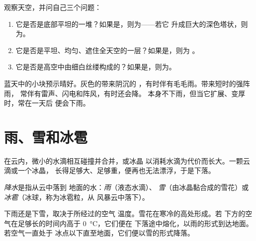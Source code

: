 \begin{method}[识别云]\label{met:g4:clouds-rain-snow:naming}
观察天空，并问自己三个问题：
\begin{enumerate}
  \item 它是否是底部平坦的一堆？如果是，则为——若它
        升成巨大的深色塔状，则为。
  \item 它是否是平坦、均匀、遮住全天空的一层？如果是，则为
        。
  \item 它是否是高空中由细白丝缕构成的？如果是，则为。
\end{enumerate}
\end{method}

\begin{remark}[云预示天气]\label{rem:g4:clouds-rain-snow:tell}
蓝天中的小块预示晴好。灰色的带来阴沉的
，有时伴有毛毛雨。带来短时的强阵雨，
常伴有雷声、闪电和阵风，有时还会降。
本身不下雨，但当它扩展、变厚时，常在一天后
便会下雨。
\end{remark}

\section{雨、雪和冰雹}

在云内，微小的水滴相互碰撞并合并，或冰晶
以消耗水滴为代价而长大。一颗云滴或一个冰晶，
长得足够大、足够重，便再也无法漂浮，于是下落。

\begin{definition}[降水]\label{def:g4:clouds-rain-snow:precipitation}
\emph{降水}是指从云中落到
地面的水：\emph{雨}（液态水滴）、
\emph{雪}（由冰晶黏合成的雪花）或
\emph{冰雹}（冰球，称为冰雹粒，从
风暴云中落下）。
\end{definition}

下雨还是下雪，取决于所经过的空气
温度。雪花在寒冷的高处形成。若
下方的空气在足够长的时间内高于 \SI{0}{\celsius}，它们便在
下落途中熔化，以雨的形式到达地面。若空气一直处于
冰点以下直至地面，它们便以雪的形式降落。

